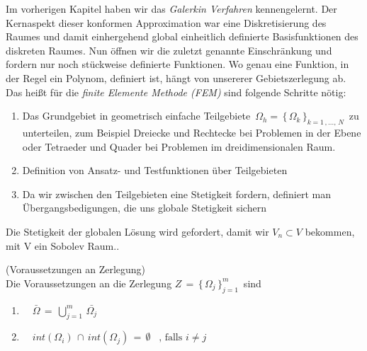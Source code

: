 Im vorherigen Kapitel haben wir das \textit{Galerkin Verfahren} kennengelernt. Der Kernaspekt dieser konformen Approximation war eine Diskretisierung des Raumes und damit einhergehend global einheitlich definierte Basisfunktionen des diskreten Raumes. Nun öffnen wir die zuletzt genannte Einschränkung und fordern nur noch stückweise definierte Funktionen. Wo genau eine Funktion, in der Regel ein Polynom, definiert ist, hängt von unsererer Gebietszerlegung ab.
Das heißt für die \textit{finite Elemente Methode (FEM)} sind folgende Schritte nötig:
\begin{enumerate}
\item Das Grundgebiet in geometrisch einfache Teilgebiete $ \, \Omega_h = \, \{ \, \Omega_k \, \}_{k=1 \, , \dots, \, N} \, $ zu unterteilen, zum Beispiel Dreiecke und Rechtecke bei Problemen in der Ebene oder Tetraeder und Quader bei Problemen im dreidimensionalen Raum.
\item Definition von Ansatz- und Testfunktionen über Teilgebieten 
\item Da wir zwischen den Teilgebieten eine Stetigkeit fordern, definiert man Übergangsbedigungen, die uns globale Stetigkeit sichern
\end{enumerate}
Die Stetigkeit der globalen Lösung wird gefordert, damit wir $V_n \subset V$ bekommen, mit V ein Sobolev Raum.\cite[175]{Numerik}. 


\begin{Bemerkung} (Voraussetzungen an Zerlegung) \cite[176]{Numerik} \\
Die Voraussetzungen an die Zerlegung $Z \, = \, \{  \, \Omega_j  \, \}_{j=1}^{m} \, $ sind 
\begin{enumerate}
\item \, \, $\bar{\Omega} \, = \,  \bigcup\limits_{j=1}^{m} \, \bar{\Omega_j}  $
\item  \, \, $int (\Omega_i) \, \cap \, int (\Omega_j) \, = \,  \emptyset  \, \, \, \text{ , falls } i \neq j $
\end{enumerate}
\end{Bemerkung}

